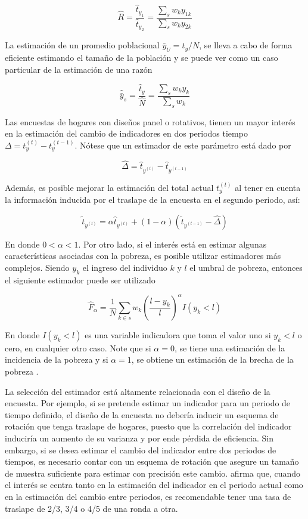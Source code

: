 \documentclass[12pt,spanish,]{book}
\begin{document}
\[
\hat{R}= \frac{\hat{t}_{y_1}}{\hat{t}_{y_2}}
= \frac{\sum_s w_k y_{1k}} {\sum_s w_k y_{2k}}
\]

La estimación de un promedio poblacional \(\bar{y}_U = t_y / N\), se lleva a cabo de forma eficiente estimando el tamaño de la población y se puede ver como un caso particular de la estimación de una razón

\[
\hat{\bar{y}}_s= \frac{\hat{t}_y}{\hat{N}} 
= \frac{\sum_s w_k y_k}{\sum_s w_k}
\]

Las encuestas de hogares con diseños panel o rotativos, tienen un mayor interés en la estimación del cambio de indicadores en dos periodos tiempo \(\Delta = t_y^{(t)} - t_y^{(t-1)}\). Nótese que un estimador de este parámetro está dado por

\[
\hat{\Delta} = \hat{t}_{y^{(t)}} - \hat{t}_{y^{(t-1)}}
\]

Además, es posible mejorar la estimación del total actual \(t_y^{(t)}\) al tener en cuenta la información inducida por el traslape de la encuesta en el segundo periodo, así:

\[
\tilde{t}_{y^{(t)}} = \alpha \hat{t}_{y^{(t)}} 
+ (1 -\alpha) (\tilde{t}_{y^{(t-1)}} - \hat{\Delta})
\]

En donde \(0 < \alpha < 1\). Por otro lado, si el interés está en estimar algunas características asociadas con la pobreza, es posible utilizar estimadores más complejos. Siendo \(y_k\) el ingreso del individuo \(k\) y \(l\) el umbral de pobreza, entonces el siguiente estimador puede ser utilizado

\[
\hat{F}_{\alpha}=\frac{1}{N}\sum_{k\in s} w_k 
\left(\frac{l-y_k}{l}\right)^{\alpha}I(y_k<l)
\]

En donde \(I(y_k<l)\) es una variable indicadora que toma el valor uno si \(y_k<l\) o cero, en cualquier otro caso. Note que si \(\alpha = 0\), se tiene una estimación de la incidencia de la pobreza y si \(\alpha = 1\), se obtiene un estimación de la brecha de la pobreza \autocite{Foster_Greer_Thorbecke_1984}.

La selección del estimador está altamente relacionada con el diseño de la encuesta. Por ejemplo, si se pretende estimar un indicador para un periodo de tiempo definido, el diseño de la encuesta no debería inducir un esquema de rotación que tenga traslape de hogares, puesto que la correlación del indicador induciría un aumento de su varianza y por ende pérdida de eficiencia. Sin embargo, si se desea estimar el cambio del indicador entre dos periodos de tiempos, es necesario contar con un esquema de rotación que asegure un tamaño de muestra suficiente para estimar con precisión este cambio. \textcite[sección 12.13]{Cochran_1977} afirma que, cuando el interés se centra tanto en la estimación del indicador en el periodo actual como en la estimación del cambio entre periodos, es recomendable tener una tasa de traslape de 2/3, 3/4 o 4/5 de una ronda a otra.
\end{document}
